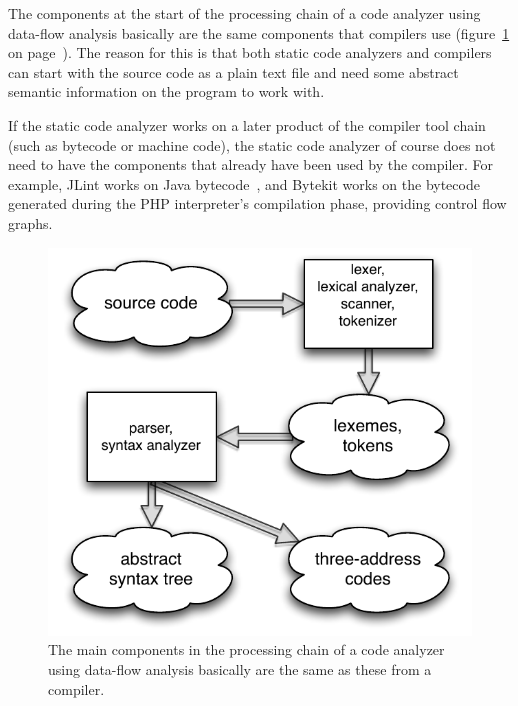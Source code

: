 The components at the start of the processing chain of a code analyzer using data-flow analysis basically are the same components that compilers use (figure~\ref{fig:compiler-parts} on page~\pageref{fig:compiler-parts}). The reason for this is that both static code analyzers and compilers can start with the source code as a plain text file and need some abstract semantic information on the program to work with.

If the static code analyzer works on a later product of the compiler tool chain (such as bytecode or machine code), the static code analyzer of course does not need to have the components that already have been used by the compiler. For example, JLint works on Java bytecode~\cite{comparison-of-bug-finding-tools}, and Bytekit works on the bytecode generated during the PHP interpreter's compilation phase, providing control flow graphs.~\cite{bytekit, bytekit-cli}

\begin{figure}[htb]
  \begin{center}
    \includegraphics[scale=1.0]{images/compiler-parts}
    \caption{The main components in the processing chain of a code analyzer using data-flow analysis basically are the same as these from a compiler.}
    \label{fig:compiler-parts}
  \end{center}
\end{figure}


